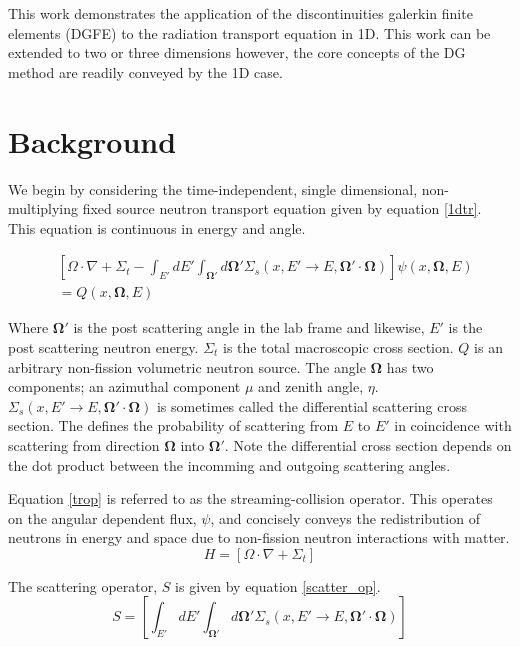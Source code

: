 This work demonstrates the application of the discontinuities galerkin finite elements (DGFE)
to the radiation transport equation in 1D.  This work can be extended to two or
three dimensions however, the core concepts of the DG method are readily conveyed by the 1D case.

\section{Background}

We begin by considering the time-independent, single dimensional, non-multiplying fixed source neutron transport equation given by equation \ref{1dtr}.  This equation is continuous in energy and angle.

\begin{eqnarray}
& \left[ \Omega \cdot \nabla + \Sigma_t -
\int_{E'} dE' \int_{\mathbf\Omega'} d \mathbf\Omega'
\Sigma_s \left(x, E' \rightarrow E , \mathbf\Omega' \cdot \mathbf\Omega \right) \right] 
\psi(x, \mathbf\Omega, E)  \nonumber \\
& =
Q(x, \mathbf\Omega, E)
\label{1dtr}
\end{eqnarray}

Where $\mathbf\Omega'$ is the post scattering angle in the lab frame and likewise, $E'$ is the post scattering neutron energy.  $\Sigma_t$ is the total macroscopic cross section.  $Q$ is an arbitrary non-fission volumetric neutron source.  The angle $\mathbf\Omega$ has two components; an azimuthal component $\mu$ and zenith angle, $\eta$.
$\Sigma_s \left(x, E' \rightarrow E , \mathbf\Omega' \cdot \mathbf\Omega \right)$ is sometimes called the differential scattering cross section.  The defines the probability of scattering from $E$ to $E'$ in coincidence with scattering from direction $\mathbf\Omega$ into $\mathbf\Omega'$.  Note the differential cross section depends on the dot product between the incomming and outgoing scattering angles.  

Equation \ref{trop} is referred to as the streaming-collision operator.  This operates on the angular dependent flux, $\psi$, and concisely conveys the redistribution of neutrons in energy and space due to non-fission neutron interactions with matter.
\begin{equation}
H = \left[ \Omega \cdot \nabla + \Sigma_t 
 \right]
\label{trop}
\end{equation}

The scattering operator, $S$ is given by equation \ref{scatter_op}.
\begin{equation}
S = \left[ 
\int_{E'} dE' \int_{\mathbf\Omega'} d \mathbf\Omega'
\Sigma_s \left(x, E' \rightarrow E , \mathbf\Omega' \cdot \mathbf\Omega \right)
 \right]
\label{scatter_op}
\end{equation}

